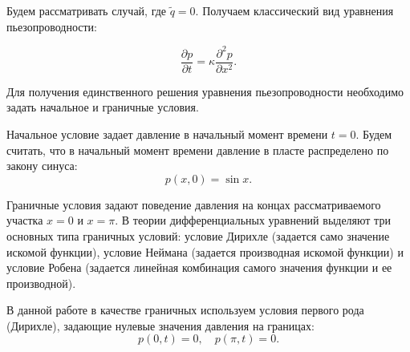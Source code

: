 \documentclass[12pt, a4paper]{article}
\begin{document}


Будем рассматривать случай, где \(\tilde{q} = 0\). Получаем классический вид уравнения пьезопроводности:

\begin{equation}
    \frac{\partial p}{\partial t} = \kappa \frac{\partial^2 p}{\partial x^2}.
\end{equation}

Для получения единственного решения уравнения пьезопроводности необходимо задать начальное и граничные условия.

Начальное условие задает давление в начальный момент времени \(t=0\). Будем считать, что в начальный момент времени давление в пласте распределено по закону синуса:
\begin{equation}
    p(x, 0) = \sin x.
\end{equation}

Граничные условия задают поведение давления на концах рассматриваемого участка \(x = 0\) и \(x = \pi\). В теории дифференциальных уравнений выделяют три основных типа граничных условий: условие Дирихле (задается само значение искомой функции), условие Неймана (задается производная искомой функции) и условие Робена (задается линейная комбинация самого значения функции и ее производной).

В данной работе в качестве граничных используем условия первого рода (Дирихле), задающие нулевые значения давления на границах:
\begin{equation}
    p(0, t) = 0, \quad p(\pi, t) = 0.
\end{equation}
\end{document}
